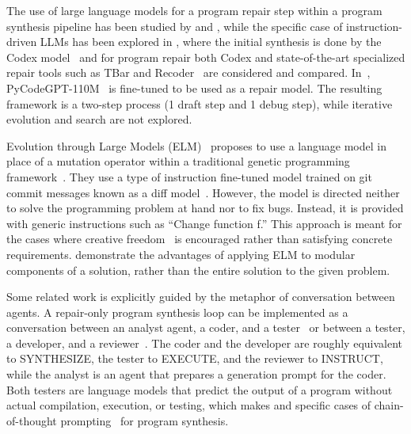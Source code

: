 The use of large language models for a program repair step within a program synthesis pipeline has been studied by \cite{joshi2022:repair} and \cite{guptaSynthesizeExecuteDebug2020},  while the specific case of instruction-driven LLMs has been explored in \cite{fanAutomatedRepairPrograms2023}, where the initial synthesis is done by the Codex model~\cite{chenEvaluatingLargeLanguage2021} and for program repair both Codex and state-of-the-art specialized repair tools such as TBar and Recoder~\cite{justDefects4JDatabaseExisting2014} are considered and compared. 
In~\cite{zhangSelfEditFaultAwareCode2023}, PyCodeGPT-110M~\cite{zanCERTContinualPretraining2022} is fine-tuned to be used as a repair model. 
The resulting framework is a two-step process (1 draft step and 1 debug step), while iterative evolution and search are not explored. 

Evolution through Large Models (ELM)~\cite{lehmanEvolutionLargeModels2022} proposes to use a language model in place of a mutation operator within a traditional genetic programming framework~\cite{koza1994:genetic}. They use a type of instruction fine-tuned model trained on git commit messages known as a diff model~\cite{DiffModelsNew2023}. 
However, the model is directed neither to solve the programming problem at hand nor to fix bugs.
Instead, it is provided with generic instructions such as ``Change function f.'' 
This approach is meant for the cases where creative freedom~\cite{stanleyWhyGreatnessCannot2015a} is encouraged rather than satisfying concrete requirements.
\cite{liu2023algorithm} demonstrate the advantages of applying ELM to modular components of a solution, rather than the entire solution to the given problem.

Some related work is explicitly guided by the metaphor of conversation between agents. 
A repair-only program synthesis loop can be implemented as a conversation between an analyst agent, a coder, and a tester~\cite{zhang2023steam} or between a tester, a developer, and a reviewer~\cite{dongSelfcollaborationCodeGeneration2023}. 
The coder and the developer are roughly equivalent to SYNTHESIZE, the tester to EXECUTE, and the reviewer to INSTRUCT, while the analyst is an agent that prepares a generation prompt for the coder. 
Both testers are language models that predict the output of a program without actual compilation, execution, or testing, which makes \cite{dongSelfcollaborationCodeGeneration2023} and \cite{zhang2023steam} specific cases of chain-of-thought prompting~\cite{yuBetterChainofThoughtPrompting2023} for program synthesis.

